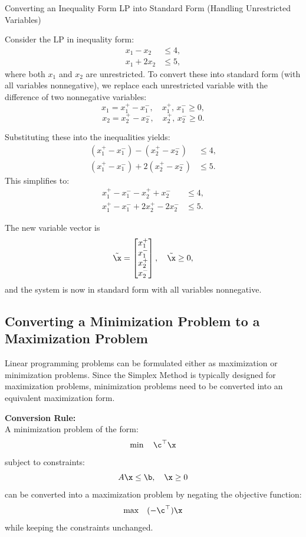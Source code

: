 \begin{example}{Converting an Inequality Form LP into Standard Form (Handling Unrestricted Variables)}{}{}

Consider the LP in inequality form:
\[
\begin{aligned}
x_1 - x_2 &\le 4,\\[1mm]
x_1 + 2x_2 &\le 5,
\end{aligned}
\]
where both \(x_1\) and \(x_2\) are unrestricted. To convert these into standard form (with all variables nonnegative), we replace each unrestricted variable with the difference of two nonnegative variables:
\[
x_1 = x_1^+ - x_1^-, \quad x_1^+,\, x_1^- \ge 0,
\]
\[
x_2 = x_2^+ - x_2^-, \quad x_2^+,\, x_2^- \ge 0.
\]

Substituting these into the inequalities yields:
\[
\begin{aligned}
(x_1^+ - x_1^-) - (x_2^+ - x_2^-) &\le 4,\\[1mm]
(x_1^+ - x_1^-) + 2(x_2^+ - x_2^-) &\le 5.
\end{aligned}
\]
This simplifies to:
\[
\begin{aligned}
x_1^+ - x_1^- - x_2^+ + x_2^- &\le 4,\\[1mm]
x_1^+ - x_1^- + 2x_2^+ - 2x_2^- &\le 5.
\end{aligned}
\]

The new variable vector is
\[
\tilde{\x} = \begin{bmatrix}x_1^+ \\ x_1^- \\ x_2^+ \\ x_2^-\end{bmatrix}, \quad \tilde{\x} \ge 0,
\]
and the system is now in standard form with all variables nonnegative.
\end{example}



\subsection{Converting a Minimization Problem to a Maximization Problem}

Linear programming problems can be formulated either as maximization or minimization problems. Since the Simplex Method is typically designed for maximization problems, minimization problems need to be converted into an equivalent maximization form.

\textbf{Conversion Rule:} \\
A minimization problem of the form:
\[
\min \quad \c^\top \x
\]
subject to constraints:
\[
A \x \leq \b, \quad \x \geq 0
\]
can be converted into a maximization problem by negating the objective function:
\[
\max \quad (-\c^\top) \x
\]
while keeping the constraints unchanged.

